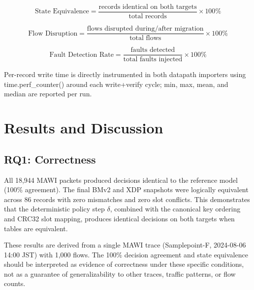 \documentclass[10pt, conference, compsoc]{IEEEtran}
\begin{document}
\begin{equation}
    \text{State Equivalence} =
    \frac{\text{records identical on both targets}}{\text{total records}}
    \times 100\%
\label{eq:state_equivalence}
\end{equation}

\begin{equation}
    \text{Flow Disruption} =
    \frac{\text{flows disrupted during/after migration}}{\text{total flows}}
    \times 100\%
\label{eq:flow_disruption}
\end{equation}

\begin{equation}
    \text{Fault Detection Rate} =
    \frac{\text{faults detected}}{\text{total faults injected}} \times 100\%
\label{eq:fault_detection}
\end{equation}

Per-record write time is directly instrumented in both datapath importers using
time.perf\_counter() around each write+verify cycle; min, max, mean, and median
are reported per run.

\section{Results and Discussion}
\label{sec:results}

\subsection{RQ1: Correctness}
\label{subsec:rq1}
All 18{,}944 MAWI packets produced decisions identical to the reference model
(100\% agreement). The final BMv2 and XDP snapshots were logically equivalent
across 86 records with zero mismatches and zero slot conflicts. This
demonstrates that the deterministic policy step $\delta$, combined with the
canonical key ordering and CRC32 slot mapping, produces identical decisions on
both targets when tables are equivalent.

These results are derived from a single MAWI trace (Samplepoint-F, 2024-08-06
14:00 JST) with 1,000 flows. The 100\% decision agreement and state equivalence
should be interpreted as evidence of correctness under these specific
conditions, not as a guarantee of generalizability to other traces, traffic
patterns, or flow counts.
\end{document}

